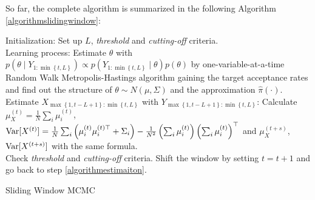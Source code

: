 So far, the complete algorithm is summarized in the following Algorithm \ref{algorithmslidingwindow}: 

\begin{algorithm}[h]
\SetAlgoLined 
Initialization: Set up $L$, \textit{threshold} and  \textit{cutting-off} criteria. \\
Learning process: Estimate $\theta$ with $p\left(\theta\mid Y_{1:\min \left\lbrace t,L\right\rbrace } \right) \propto p\left(Y_{1:\min \left\lbrace t,L\right\rbrace } \mid \theta \right)p\left(\theta \right)$ by one-variable-at-a-time Random Walk Metropolis-Hastings algorithm gaining the target acceptance rates and find out the structure of $\theta\sim N\left(\mu,\Sigma\right)$ and the approximation $\hat{\pi}\left(\cdot\right)$. \label{algorithmlearningsurface}\\
Estimate $X_{ \max\left\lbrace 1,t-L+1 \right\rbrace :\min \left\lbrace t,L\right\rbrace }$ with $Y_{ \max\left\lbrace 1,t-L+1 \right\rbrace :\min \left\lbrace t,L\right\rbrace }$: 
Calculate $\mu_X^{\left(t\right)} = \frac{1}{N} \sum_i \mu_i^{\left(t\right)}$, $\mathrm{Var}\lbrack X^{\left(t\right)}\rbrack = \frac{1}{N} \sum_i \left(\mu_i^{\left(t\right)} \mu_i^{\left(t\right)\top} +\Sigma_i\right) -\frac{1}{N^2} \left(\sum_i  \mu_i^{\left(t\right)}\right) \left(\sum_i \mu_i^{\left(t\right)}\right)^\top$ and $\mu_X^{\left(t+s\right)}$, $\mathrm{Var}\lbrack X^{\left(t+s\right)}\rbrack$ with the same formula.  \\
Check \textit{threshold} and  \textit{cutting-off} criteria. 
Shift the window by setting $t = t+1$ and go back to step \ref{algorithmestimaiton}.
 \caption{Sliding Window MCMC}\label{algorithmslidingwindow}
\end{algorithm}



